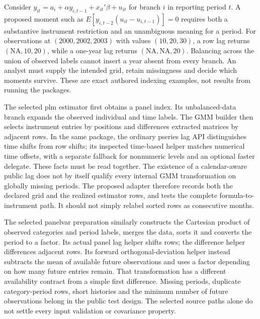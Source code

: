 Consider $y_{it}=a_i+\alpha y_{i,t-1}+x_{it}'\beta+u_{it}$ for branch $i$ in reporting period $t$. A proposed moment such as $E[y_{i,t-2}(u_{it}-u_{i,t-1})]=0$ requires both a substantive instrument restriction and an unambiguous meaning for a period. For observations at $(2000,2002,2003)$ with values $(10,20,30)$, a row lag returns $(\mathrm{NA},10,20)$, while a one-year lag returns $(\mathrm{NA},\mathrm{NA},20)$. Balancing across the union of observed labels cannot insert a year absent from every branch. An analyst must supply the intended grid, retain missingness and decide which moments survive. These are exact authored indexing examples, not results from running the packages.~\citep{exec25_rdyn_choice}

The selected plm estimator first obtains a panel index. Its unbalanced-data branch expands the observed individual and time labels. The GMM builder then selects instrument entries by positions and differences extracted matrices by adjacent rows. In the same package, the ordinary pseries lag API distinguishes time shifts from row shifts; its inspected time-based helper matches numerical time offsets, with a separate fallback for nonnumeric levels and an optional faster delegate. These facts must be read together. The existence of a calendar-aware public lag does not by itself qualify every internal GMM transformation on globally missing periods. The proposed adapter therefore records both the declared grid and the realized estimator rows, and tests the complete formula-to-instrument path. It should not simply relabel sorted rows as consecutive months.~\citep{exec25_rdyn_plm}

The selected panelvar preparation similarly constructs the Cartesian product of observed categories and period labels, merges the data, sorts it and converts the period to a factor. Its actual panel lag helper shifts rows; the difference helper differences adjacent rows. Its forward orthogonal-deviation helper instead subtracts the mean of available future observations and uses a factor depending on how many future entries remain. That transformation has a different availability contract from a simple first difference. Missing periods, duplicate category-period rows, short histories and the minimum number of future observations belong in the public test design. The selected source paths alone do not settle every input validation or covariance property.~\citep{exec25_rdyn_panelvar}

